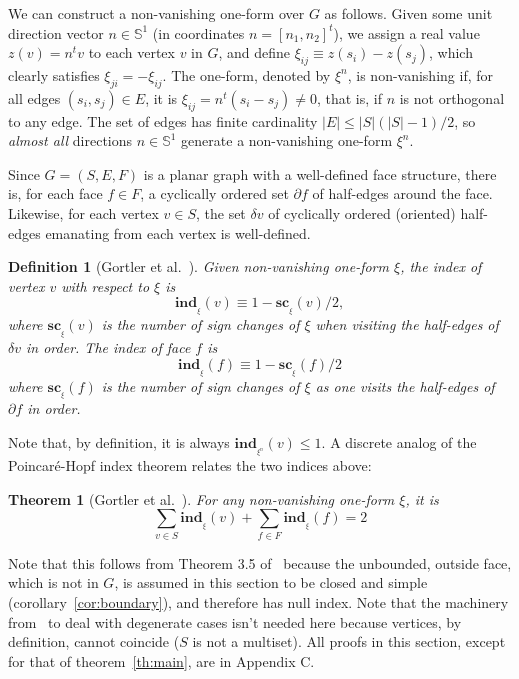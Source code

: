 \documentclass[11pt]{article}
\newtheorem{theorem}{Theorem}
\newtheorem{definition}{Definition}
\newcommand{\Sites}{S}
\begin{document}
We can construct a non-vanishing one-form
over $G$ as follows. 
Given some unit direction vector $n\in\mathbb{S}^1$
(in coordinates $n=\left[n_1,n_2\right]^t$), 
we assign a real
value $z(v) = n^t v$ to each vertex $v$ in $G$, and define 
$\xi_{ij} \equiv z(s_i) - z(s_j)$, which clearly satisfies 
$\xi_{ji} = -\xi_{ij}$. The one-form, denoted by $\xi^n$, 
is non-vanishing if, for all edges $(s_i,s_j)\in E$, 
it is $\xi_{ij} = n^t (s_i - s_j) \neq 0$, 
that is, if $n$ is not orthogonal to any edge. 
The set of edges has finite cardinality $|E| \le |\Sites| (|\Sites|-1)/2$,  
so \emph{almost all} directions $n\in\mathbb{S}^1$ generate a non-vanishing one-form $\xi^n$. 


Since $G=(\Sites,E,F)$ is a planar graph with a well-defined face structure,
there is, for each face $f\in F$, a cyclically ordered set
$\partial f$ of half-edges around the face. 
Likewise, for each vertex $v\in \Sites$, the set $\delta v$ of cyclically ordered
(oriented) half-edges emanating from each vertex is well-defined. 

\begin{definition}[Gortler et al.\ \cite{1form}]
Given non-vanishing one-form $\xi$,
the index of vertex $v$ with respect to $\xi$ is \[\mathbf{ind}_{_{\xi}}(v) \equiv 1 - \mathbf{sc}_{_{\xi}}(v) / 2, \]
	where $\mathbf{sc}_{_{\xi}}(v)$ is the number of sign changes of $\xi$ 
	when visiting the half-edges of $\delta v$ in order. 
The index of face $f$ is \[\mathbf{ind}_{_{\xi}}(f) \equiv 1 - \mathbf{sc}_{_{\xi}}(f)/2\] where $\mathbf{sc}_{_{\xi}}(f)$ is the number
of sign changes of $\xi$ as one visits the half-edges of $\partial f$ in order. 
\end{definition}

Note that, by definition, it is always $\mathbf{ind}_{_{\xi^n}}(v) \le 1$. 
A discrete analog of the Poincar\'e-Hopf index theorem relates 
the two indices above:

\begin{theorem}[Gortler et al.\ \cite{1form}]\label{lem:ph}
For any non-vanishing one-form $\xi$, it is 
\[ \displaystyle{\sum_{v\in \Sites} \mathbf{ind}_{_{\xi}}(v) + \sum_{f\in F} \mathbf{ind}_{_{\xi}}(f) = 2} \]
\end{theorem}

Note that this follows from Theorem 3.5 of~\cite{1form} because the unbounded, 
outside face, which is not in $G$, is assumed in this section to be closed and simple
(corollary~\ref{cor:boundary}), and therefore has null index. Note that the machinery from~\cite{1form} to deal with degenerate cases
isn't needed here because vertices, by definition, cannot coincide ($\Sites$ is not a multiset). 
All  proofs in this section, except for that of theorem~\ref{th:main}, are  in Appendix C. 
\end{document}
